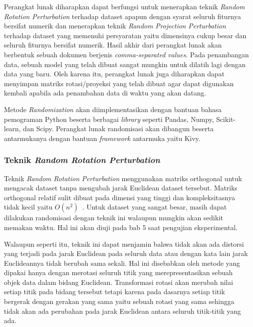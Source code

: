 Perangkat lunak diharapkan dapat berfungsi untuk menerapkan teknik \textit{Random Rotation Perturbation} terhadap dataset apapun dengan syarat seluruh fiturnya bersifat numerik dan menerapkan teknik \textit{Random Projection Perturbation} terhadap dataset yang memenuhi persyaratan yaitu dimensinya cukup besar dan seluruh fiturnya bersifat numerik. Hasil akhir dari perangkat lunak akan berbentuk sebuah dokumen berjenis \textit{comma-separated values}. Pada penambangan data, sebuah model yang telah dibuat sangat mungkin untuk dilatih lagi dengan data yang baru. Oleh karena itu, perangkat lunak juga diharapkan dapat menyimpan matriks rotasi/proyeksi yang telah dibuat agar dapat digunakan kembali apabila ada penambahan data di waktu yang akan datang.

Metode \textit{Randomization} akan diimplementasikan dengan bantuan bahasa pemograman Python beserta berbagai \textit{library} seperti Pandas, Numpy, Scikit-learn, dan Scipy. Perangkat lunak randomisasi akan dibangun beserta antarmukanya dengan bantuan \textit{framework} antarmuka yaitu Kivy.

\subsubsection{Teknik \textit{Random Rotation Perturbation}}
\label{subsubsec:analisis-rrp}

Teknik \textit{Random Rotation Perturbation} menggunakan matriks orthogonal untuk mengacak dataset tanpa mengubah jarak Euclidean dataset tersebut. Matriks orthogonal relatif sulit dibuat pada dimensi yang tinggi dan kompleksitasnya tidak kecil yaitu \(O(n^2)\)~\cite{stewart:80:orthogonal}. Untuk dataset yang sangat besar, masih dapat dilakukan randomisasi dengan teknik ini walaupun mungkin akan sedikit memakan waktu. Hal ini akan diuji pada bab 5 saat pengujian eksperimental.

Walaupun seperti itu, teknik ini dapat menjamin bahwa tidak akan ada distorsi yang terjadi pada jarak Euclidean pada seluruh data atau dengan kata lain jarak Euclideannya tidak berubah sama sekali. Hal ini disebabkan oleh metode yang dipakai hanya dengan merotasi seluruh titik yang merepresentasikan sebuah objek data dalam bidang Euclidean. Transformasi rotasi akan merubah nilai setiap titik pada bidang tersebut tetapi karena pada dasarnya setiap titik bergerak dengan gerakan yang sama yaitu sebuah rotasi yang sama sehingga tidak akan ada perubahan pada jarak Euclidean antara seluruh titik-titik yang ada.

